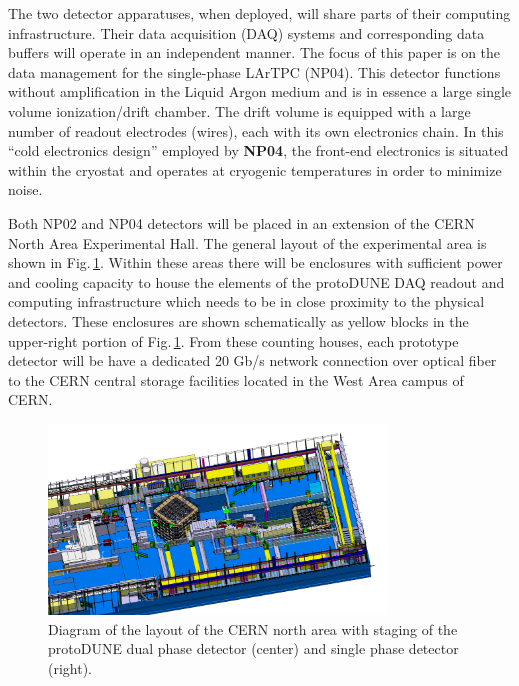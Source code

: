 \documentclass[pdftex,12pt,letter]{article}
\newcommand{\pd}{protoDUNE\xspace}
\begin{document}
The two detector apparatuses, when deployed, will share parts of their
computing infrastructure.  Their data acquisition (DAQ) systems and
corresponding data buffers will operate in an independent manner. 
The focus of this paper is on the data management for the
single-phase LArTPC (NP04).
This detector  functions without amplification
in the Liquid Argon medium and is in essence a large single volume
ionization/drift chamber.  The drift volume is equipped with
a large number of readout electrodes (wires), each with its own electronics chain.
In this ``cold electronics design'' employed by \textbf{NP04},  the front-end electronics is situated within the cryostat and operates at cryogenic
temperatures in order to minimize noise.

Both NP02 and NP04 detectors will be placed in an extension of the CERN North Area Experimental Hall.
The general layout of the experimental area is shown in Fig.\,\ref{fig:np02np04}.
Within these areas there will be enclosures with sufficient power and cooling capacity to house
the elements of the \pd DAQ readout and computing infrastructure which
needs to be in close proximity to the physical detectors.
These enclosures are shown schematically as yellow blocks in the
upper-right portion of Fig.\,\ref{fig:np02np04}. From these counting
houses, each prototype detector will be have a dedicated 20 Gb/s
network connection over optical fiber to the CERN central storage
facilities located in the West Area campus of CERN.  

\begin{figure}[tb]
\centering\includegraphics[width=0.8\textwidth]{np02np04.png}
\caption{\label{fig:np02np04}Diagram of the layout of the CERN north area with
  staging of the protoDUNE dual phase detector (center) and single
  phase detector (right).}
\end{figure}
\end{document}
